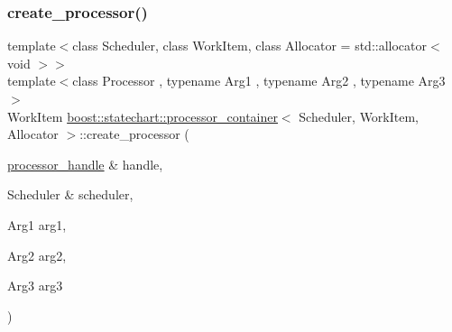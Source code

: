 \mbox{\label{classboost_1_1statechart_1_1processor__container_ae6f1aee0d18c8cb6f1558b830d2ab573}} 
\subsubsection{\texorpdfstring{create\+\_\+processor()}{create\_processor()}\hspace{0.1cm}{\footnotesize\ttfamily [4/7]}}
{\footnotesize\ttfamily template$<$class Scheduler, class Work\+Item, class Allocator = std\+::allocator$<$ void $>$$>$ \\
template$<$class Processor , typename Arg1 , typename Arg2 , typename Arg3 $>$ \\
Work\+Item \mbox{\hyperlink{classboost_1_1statechart_1_1processor__container}{boost\+::statechart\+::processor\+\_\+container}}$<$ Scheduler, Work\+Item, Allocator $>$\+::create\+\_\+processor (\begin{DoxyParamCaption}\item[{\mbox{\hyperlink{classboost_1_1statechart_1_1processor__container_a82ebbffaed81d7b99119ae0e892f6411}{processor\+\_\+handle}} \&}]{handle,  }\item[{Scheduler \&}]{scheduler,  }\item[{Arg1}]{arg1,  }\item[{Arg2}]{arg2,  }\item[{Arg3}]{arg3 }\end{DoxyParamCaption})\hspace{0.3cm}{\ttfamily [inline]}}

\mbox{\label{classboost_1_1statechart_1_1processor__container_a6ee0545652d45cff1d1d04f7d4323144}} 
